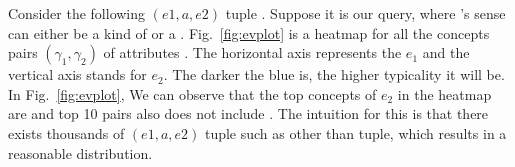 \begin{example}
Consider the following $(e1,a,e2)$ tuple . Suppose it is our query, where 's sense can either be a kind of  or a .
Fig.~\ref{fig:evplot} is a heatmap for all the concepts pairs $(\gamma_1,\gamma_2)$ of attributes . The horizontal axis represents the $e_1$ and the vertical axis stands for $e_2$. The darker the blue is, the higher typicality it will be. In Fig.~\ref{fig:evplot}, We can observe that the top concepts of $e_2$ in the heatmap are  and top 10 pairs also does not include . The intuition for this is that there exists thousands of $(e1,a,e2)$ tuple such as  other than  tuple, which results in a reasonable distribution.
\label{exa:sd}
\end{example}





